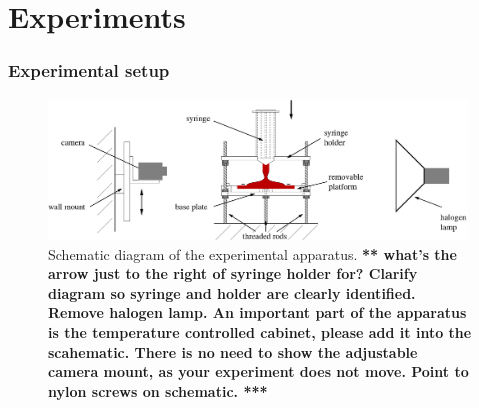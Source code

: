 \documentclass[aip,graphicx]{revtex4-1}
\begin{document}
\section{Experiments}
\label{sec:experiments}

\subsubsection{Experimental setup}
\label{setup}

\begin{figure}[!h]
\centering
\includegraphics[width=0.99\textwidth]{figures/experimental_apparatus.eps}
\caption{Schematic diagram of the experimental apparatus.
{\bf *** what's the arrow just to the right of syringe holder for? Clarify diagram so syringe and holder are clearly identified. Remove halogen lamp. An important part of the apparatus is the temperature controlled cabinet, please add it into the scahematic. There is no need to show the adjustable camera mount, as your experiment does not move.  Point to nylon screws on schematic. ***}}
\label{fig:experimental_apparatus}
\end{figure}
\end{document}
